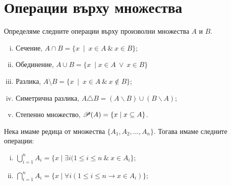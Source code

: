 
\section*{Операции върху множества}

\begin{dfn}
  Определяме следните операции върху произволни множества $A$ и $B$.
  \begin{enumerate}[(i)]
  \item
    Сечение, $A\cap B = \{x\ \mid\ x\in A\ \&\ x\in B\}$;
  \item
    Обединение, $A\cup B = \{x\ \mid x\in A\ \vee\ x\in B\}$
  \item
    Разлика, $A\setminus B = \{x\ \mid\ x\in A\ \&\ x\not\in B\}$;
  \item
    Симетрична разлика, $A\triangle B = (A\backslash B)\cup (B\backslash A)$;
  \item
    Степенно множество, $\mathscr{P}(A) = \{x\mid x\subseteq A\}$.
  \end{enumerate}
  Нека имаме редица от множества $\{A_1,A_2,\dots,A_n\}$.
  Тогава имаме следните операции:
  \begin{enumerate}[i)]
  \item
    $\bigcup^{n}_{i=1} A_i = \{x \mid \exists i (1\leq i\leq n\ \&\ x\in A_i \}$;
  \item
    $\bigcap^{n}_{i=1} A_i = \{x \mid \forall i (1\leq i\leq n \rightarrow x\in A_i)\}$;    
  \end{enumerate}
\end{dfn}

